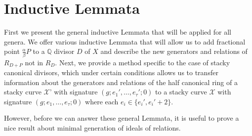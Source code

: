 \documentclass{amsart}
\theoremstyle{plain}
\newtheorem{lem}[thm]{Lemma}
\theoremstyle{definition}
\theoremstyle{remark}
\newtheorem{rem}[thm]{Remark}
\numberwithin{equation}{section}
\newcommand\BQ{{\mathbb Q}}
\newcommand \sx{\mathscr X}
\begin{document}
\section{Inductive Lemmata}
\label{sec:induction}
First we present the general inductive Lemmata that will be applied
for all genera. We offer various inductive Lemmata that will allow
us to add fractional point $\frac{\alpha}{\beta}P$ to a $\BQ$
 divisor $D$ of $X$ and describe the new generators and relations
of $R_{D + P}$ not in $R_D$. Next, we provide a method specific to
the case of stacky canonical divisors, which
under certain conditions allows us to transfer information about
the generators and relations of the half canonical ring of a stacky
curve $\sx$' with signature $(g; e_1', \ldots, e_\tau'; 0)$ to a
stacky curve $\sx$ with signature $(g; e_1, \ldots, e_\tau; 0)$
where each $e_i\in \{e_i', e_i' + 2\}$.   

However, before we can answer these general Lemmata, it is useful
to prove a nice result about minimal generation of ideals of
relations.


%
\end{document}

